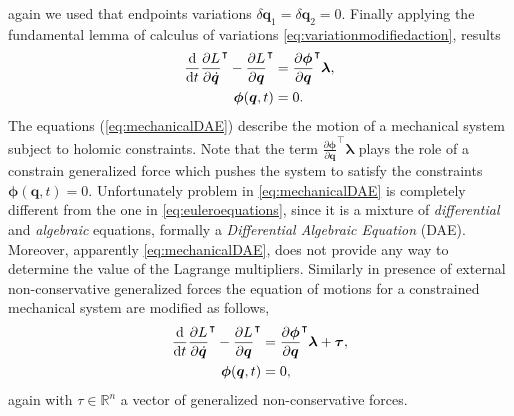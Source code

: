		again we used that endpoints variations $\delta\bm{q}_{1} = \delta\bm{q}_{2} = 0$. Finally applying the fundamental lemma of calculus of variations \cref{eq:variationmodifiedaction}, results
		\begin{subequations}
			\label{eq:mechanicalDAE}
			\begin{align}
				\frac{\mathop{}\!\mathrm{d}}{\mathop{}\!\mathrm{d} t}\frac{\partial L}{\partial\dot{\bm{q}}}^{\intercal}-\frac{\partial L}{\partial \bm{q}}^{\intercal} &= \frac{\partial\bm{\phi}}{\partial\bm{q}}^{\intercal}\bm{\lambda}, \\
				\bm{\phi}(\bm{q},t) &= 0.
			\end{align}
		\end{subequations}
		The equations (\ref{eq:mechanicalDAE}) describe the motion of a mechanical system subject to holomic constraints. Note that the term $\frac{\partial\bm{\phi}}{\partial\bm{q}}^{\intercal}\bm{\lambda}$ plays the role of a constrain generalized force which pushes the system to satisfy the constraints $\bm{\phi}(\bm{q},t) = 0$. Unfortunately problem in \cref{eq:mechanicalDAE} is completely different from the one in \cref{eq:euleroequations}, since it is a mixture of \emph{differential} and \emph{algebraic} equations, formally a \emph{Differential Algebraic Equation} (DAE). Moreover, apparently \cref{eq:mechanicalDAE}, does not provide any way to determine the value of the Lagrange multipliers. Similarly in presence of external non-conservative generalized forces the equation of motions for a constrained mechanical system are modified as follows,
		\begin{subequations}
			\begin{align}
				\frac{\mathop{}\!\mathrm{d}}{\mathop{}\!\mathrm{d} t}\frac{\partial L}{\partial\dot{\bm{q}}}^{\intercal}-\frac{\partial L}{\partial \bm{q}}^{\intercal} &= \frac{\partial\bm{\phi}}{\partial\bm{q}}^{\intercal}\bm{\lambda}+\bm{\tau},\\
				\bm{\phi}(\bm{q},t) &= 0,
			\end{align}
		\end{subequations}
		again with $\tau\in\mathbb{R}^{n}$ a vector of generalized non-conservative forces.
